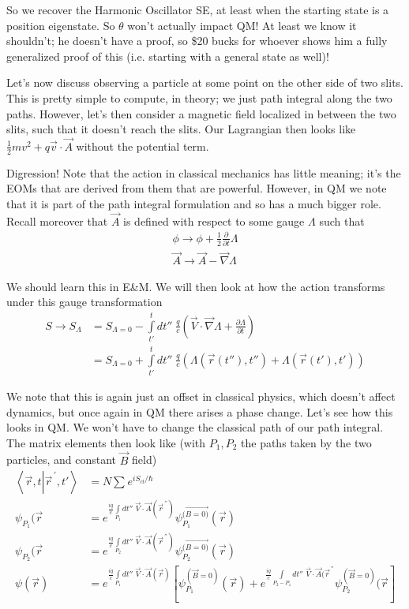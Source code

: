 \documentclass[10pt]{report}
\newcommand{\dotp}[2]{\left<#1\left.\right|#2\right>}
\newcommand{\pd}[2]{\frac{\partial #1}{\partial#2}}
\newcommand{\pvec}[1]{\vec{#1}^{\,\prime}}
\begin{document}
So we recover the Harmonic Oscillator SE, at least when the starting state is a position eigenstate. So $\theta$ won't actually impact QM! At least we know it shouldn't; he doesn't have a proof, so \$20 bucks for whoever shows him a fully generalized proof of this (i.e. starting with a general state as well)!

Let's now discuss observing a particle at some point on the other side of two slits. This is pretty simple to compute, in theory; we just path integral along the two paths. However, let's then consider a magnetic field localized in between the two slits, such that it doesn't reach the slits. Our Lagrangian then looks like $\frac{1}{2}mv^2 + q\vec{v}\cdot \vec{A}$ without the potential term.

Digression! Note that the action in classical mechanics has little meaning; it's the EOMs that are derived from them that are powerful. However, in QM we note that it is part of the path integral formulation and so has a much bigger role. Recall moreover that $\vec{A}$ is defined with respect to some gauge $\Lambda$ such that
\begin{align}
    \phi \to \phi + \frac{1}{2}\pd{}{t}\Lambda\\
    \vec{A} \to \vec{A} - \vec{\nabla}\Lambda
\end{align}

We should learn this in E\&M. We will then look at how the action transforms under this gauge transformation
\begin{align}
    S \to S_\Lambda &= S_{\Lambda = 0} - \displaystyle\int\limits_{t'}^{t}dt''\;\frac{q}{c}\left( \vec{V}\cdot \vec{\nabla}\Lambda + \pd{\Lambda}{t} \right)\\
    &= S_{\Lambda = 0} + \displaystyle\int\limits_{t'}^{t}dt''\;\frac{q}{c}\left( \Lambda\left( \vec{r}(t''),t'' \right) + \Lambda(\vec{r}(t'),t') \right)
\end{align}

We note that this is again just an offset in classical physics, which doesn't affect dynamics, but once again in QM there arises a phase change. Let's see how this looks in QM. We won't have to change the classical path of our path integral. The matrix elements then look like (with $P_1, P_2$ the paths taken by the two particles, and constant $\vec{B}$ field)
\begin{align}
    \dotp{\vec{r},t}{\pvec{r},t'} &= N\sum_{}^{}e^{iS_{cl}/\hbar}\\
    \psi_{P_1}(\vec{r} &= e^{\frac{iq}{c}\displaystyle\int\limits_{P_1}^{}dt''\;\vec{V}\cdot \vec{A}(\vec{r}^{\,''})} \psi_{P_1}^{(\vec{B = 0)}}(\vec{r})\\
    \psi_{P_2}(\vec{r} &= e^{\frac{iq}{c}\displaystyle\int\limits_{P_2}^{}dt''\;\vec{V}\cdot \vec{A}(\vec{r}^{\,''})} \psi_{P_2}^{(\vec{B = 0)}}(\vec{r})\\
    \psi(\vec{r}) &= e^{\frac{iq}{c}\displaystyle\int\limits_{P_1}^{}dt''\;\vec{V}\cdot \vec{A}(\vec{r})}\left[ \psi_{P_1}^{(\vec{B} = 0)}(\vec{r}) + e^{\frac{iq}{c}\displaystyle\int\limits_{P_2 - P_1}^{}dt''\;\vec{V}\cdot \vec{A}(\vec{r}^{\,''}}\psi_{P_2}^{(\vec{B} = 0)}(\vec{r} \right]
\end{align}
\end{document}
